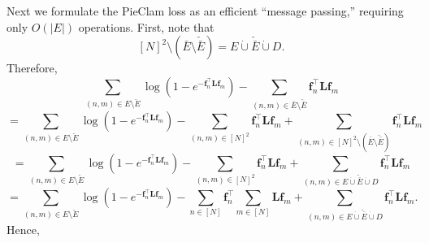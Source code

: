 \documentclass{article}
\theoremstyle{plain}
\theoremstyle{definition}
\theoremstyle{remark}
\newcommand{\ron}[1]{{{\textcolor{red}{\textbf{[Ron:} {#1}\textbf{]}}}}}
\begin{document}







Next we formulate the PieClam loss as an efficient ``message passing,'' requiring only $O(|E|)$ operations.
First, note that %
\[[N]^2\setminus (\bar{E}\setminus\check{\bar{E}}) = E \dot{\cup} \check{\bar{E}}\dot{\cup}D.\]
Therefore,
\[\underset{(n,m)\in E\setminus\check{E}}{\sum} \log(1-e^{-\mathbf{f}_n^\top \mathbf{L} \mathbf{f}_m}) - \underset{(n,m)\in \bar{E}\setminus\check{\bar{E}}}{\sum} \mathbf{f}_n^\top \mathbf{L} \mathbf{f}_m\]
\[=\underset{(n,m)\in E\setminus\check{E}}{\sum} \log(1-e^{-\mathbf{f}_n^\top \mathbf{L} \mathbf{f}_m}) 
- \underset{(n,m)\in [N]^2}{\sum} \mathbf{f}_n^\top \mathbf{L} \mathbf{f}_m
+\underset{(n,m)\in [N]^2\setminus (\bar{E}\setminus\check{\bar{E}})}{\sum} \mathbf{f}_n^\top \mathbf{L} \mathbf{f}_m\]
\[=\underset{(n,m)\in E\setminus\check{E}}{\sum} \log(1-e^{-\mathbf{f}_n^\top \mathbf{L} \mathbf{f}_m}) 
- \underset{(n,m)\in [N]^2}{\sum} \mathbf{f}_n^\top \mathbf{L} \mathbf{f}_m
+\underset{(n,m)\in E \dot{\cup} \check{\bar{E}}\dot{\cup}D}{\sum} \mathbf{f}_n^\top \mathbf{L} \mathbf{f}_m\]
\[=\underset{(n,m)\in E\setminus\check{E}}{\sum} \log(1-e^{-\mathbf{f}_n^\top \mathbf{L} \mathbf{f}_m}) 
- \underset{n\in [N]}{\sum} \mathbf{f}_n^\top \underset{m\in [N]}{\sum} \mathbf{L} \mathbf{f}_m
+\underset{(n,m)\in E \dot{\cup} \check{\bar{E}}\dot{\cup}D}{\sum} \mathbf{f}_n^\top \mathbf{L} \mathbf{f}_m.\]
Hence,
\end{document}
